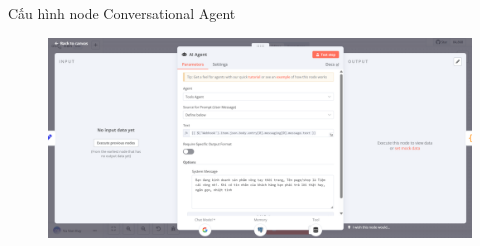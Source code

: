 \newpage

Cấu hình node Conversational Agent

\begin{figure}[htbp]
    \centering
    \includegraphics[width=1\linewidth]{Chap1-7/Agent-a.pdf}
\end{figure}

